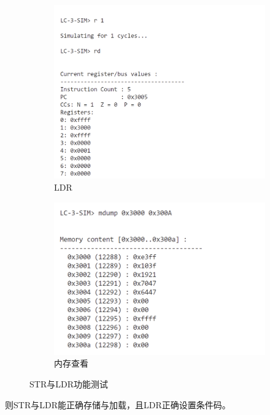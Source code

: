 \documentclass[UTF8]{ctexart}
\begin{document}
\begin{figure}[ht]
  \begin{subfigure}{0.45\textwidth}
    \includegraphics[width=\linewidth]{str3.png}
    \caption{LDR}
  \end{subfigure}
  \begin{subfigure}{0.44\textwidth}
    \includegraphics[width=\linewidth]{str4.png}
    \caption{内存查看}
  \end{subfigure}
  \caption{STR与LDR功能测试}
  \label{strldr}

\end{figure}

则STR与LDR能正确存储与加载，且LDR正确设置条件码。
\end{document}
